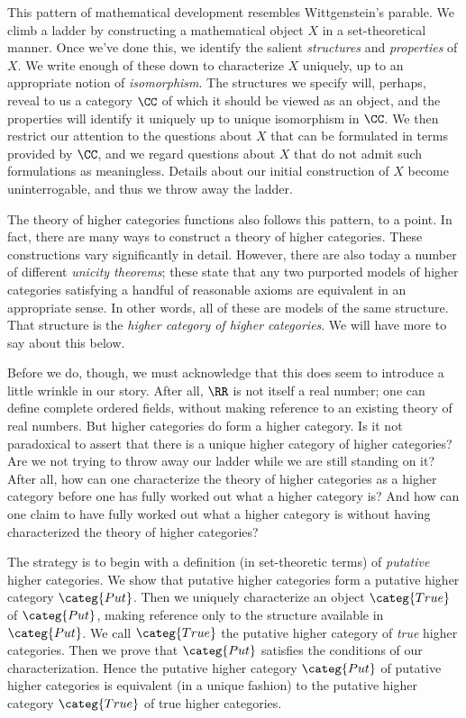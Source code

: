 This pattern of mathematical development resembles Wittgenstein's parable.
We climb a ladder by constructing a mathematical object $X$ in a set-theoretical manner.
Once we've done this, we identify the salient \emph{structures} and \emph{properties} of $X$.
We write enough of these down to characterize $X$ uniquely, up to an appropriate notion of \emph{isomorphism}.
The structures we specify will, perhaps, reveal to us a category $\CC$ of which it should be viewed as an object, and the properties will identify it uniquely up to unique isomorphism in $\CC$.
We then restrict our attention to the questions about $X$ that can be formulated in terms provided by $\CC$,
and we regard questions about $X$ that do not admit such formulations as meaningless.
Details about our initial construction of $X$ become uninterrogable, and thus we throw away the ladder.

The theory of higher categories functions also follows this pattern, to a point. 
In fact, there are many ways to construct a theory of higher categories.
These constructions vary significantly in detail.
However, there are also today a number of different \emph{unicity theorems};
these state that
any two purported models of higher categories satisfying a handful of reasonable axioms are equivalent in an appropriate sense.
In other words, all of these are models of the same structure.
That structure is the \emph{higher category of higher categories}.
We will have more to say about this below.

Before we do, though, we must acknowledge that this does seem to introduce a little wrinkle in our story.
After all, $\RR$ is not itself a real number;
one can define complete ordered fields, without making reference to an existing theory of real numbers.
But higher categories do form a higher category.
Is it not paradoxical to assert that there is a unique higher category of higher categories?
Are we not trying to throw away our ladder while we are still standing on it?
After all, how can one characterize the theory of higher categories as a higher category before one has fully worked out what a higher category is?
And how can one claim to have fully worked out what a higher category is without having characterized the theory of higher categories?

The strategy is to begin with a definition (in set-theoretic terms) of \emph{putative} higher categories.
We show that putative higher categories form a putative higher category $\categ{Put}$.
Then we uniquely characterize an object $\categ{True}$ of $\categ{Put}$, making reference only to the structure available in $\categ{Put}$.
We call $\categ{True}$ the putative higher category of \emph{true} higher categories.
Then we prove that $\categ{Put}$ satisfies the conditions of our characterization.
Hence the putative higher category $\categ{Put}$ of putative higher categories is equivalent (in a unique fashion) to the putative higher category $\categ{True}$ of true higher categories.

